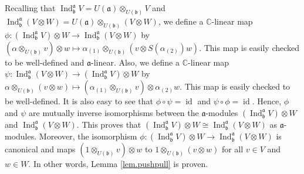\documentclass[etingof-lie.tex]{subfiles}
\begin{document}
Recalling that $\operatorname*{Ind}\nolimits_{\mathfrak{b}}^{\mathfrak{a}%
}V=U\left(  \mathfrak{a}\right)  \otimes_{U\left(  \mathfrak{b}\right)  }V$
and $\operatorname*{Ind}\nolimits_{\mathfrak{b}}^{\mathfrak{a}}\left(
V\otimes W\right)  =U\left(  \mathfrak{a}\right)  \otimes_{U\left(
\mathfrak{b}\right)  }\left(  V\otimes W\right)  $, we define a $\mathbb{C}%
$-linear map $\phi:\left(  \operatorname*{Ind}\nolimits_{\mathfrak{b}%
}^{\mathfrak{a}}V\right)  \otimes W\rightarrow\operatorname*{Ind}%
\nolimits_{\mathfrak{b}}^{\mathfrak{a}}\left(  V\otimes W\right)  $ by
$\left(  \alpha\otimes_{U\left(  \mathfrak{b}\right)  }v\right)  \otimes
w\mapsto\alpha_{\left(  1\right)  }\otimes_{U\left(  \mathfrak{b}\right)
}\left(  v\otimes S\left(  \alpha_{\left(  2\right)  }\right)  w\right)  $.
This map is easily checked to be well-defined and $\mathfrak{a}$-linear. Also,
we define a $\mathbb{C}$-linear map $\psi:\operatorname*{Ind}%
\nolimits_{\mathfrak{b}}^{\mathfrak{a}}\left(  V\otimes W\right)
\rightarrow\left(  \operatorname*{Ind}\nolimits_{\mathfrak{b}}^{\mathfrak{a}%
}V\right)  \otimes W$ by $\alpha\otimes_{U\left(  \mathfrak{b}\right)
}\left(  v\otimes w\right)  \mapsto\left(  \alpha_{\left(  1\right)  }%
\otimes_{U\left(  \mathfrak{b}\right)  }v\right)  \otimes\alpha_{\left(
2\right)  }w$. This map is easily checked to be well-defined. It is also easy
to see that $\phi\circ\psi=\operatorname*{id}$ and $\psi\circ\phi
=\operatorname*{id}$. Hence, $\phi$ and $\psi$ are mutually inverse
isomorphisms between the $\mathfrak{a}$-modules $\left(  \operatorname*{Ind}%
\nolimits_{\mathfrak{b}}^{\mathfrak{a}}V\right)  \otimes W$ and
$\operatorname*{Ind}\nolimits_{\mathfrak{b}}^{\mathfrak{a}}\left(  V\otimes
W\right)  $. This proves that $\left(  \operatorname*{Ind}%
\nolimits_{\mathfrak{b}}^{\mathfrak{a}}V\right)  \otimes W\cong%
\operatorname*{Ind}\nolimits_{\mathfrak{b}}^{\mathfrak{a}}\left(  V\otimes
W\right)  $ as $\mathfrak{a}$-modules. Moreover, the isomorphism $\phi:\left(
\operatorname*{Ind}\nolimits_{\mathfrak{b}}^{\mathfrak{a}}V\right)  \otimes
W\rightarrow\operatorname*{Ind}\nolimits_{\mathfrak{b}}^{\mathfrak{a}}\left(
V\otimes W\right)  $ is canonical and maps $\left(  1\otimes_{U\left(
\mathfrak{b}\right)  }v\right)  \otimes w$ to $1\otimes_{U\left(
\mathfrak{b}\right)  }\left(  v\otimes w\right)  $ for all $v\in V$ and $w\in
W$. In other words, Lemma \ref{lem.pushpull} is proven.
\end{document}
